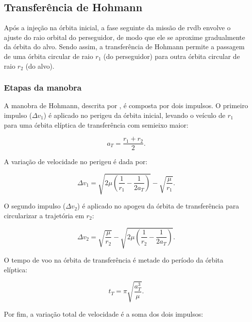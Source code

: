 \subsection{Transferência de Hohmann}
\label{sec:transf_hohmann}

Após a injeção na órbita inicial, a fase seguinte da missão de \gls{rvdb} envolve o ajuste do raio orbital do perseguidor, de modo que ele se aproxime gradualmente da órbita do alvo.
Sendo assim, a transferência de Hohmann permite a passagem de uma órbita circular de raio $r_1$ (do perseguidor) para outra órbita circular de raio $r_2$ (do alvo).

\subsubsection{Etapas da manobra}

A manobra de Hohmann, descrita por \cite{weberHohmann}, é composta por dois impulsos.
O primeiro impulso ($\Delta v_1$) é aplicado no perigeu da órbita inicial, levando o veículo de $r_1$ para uma órbita elíptica de transferência com semieixo maior:

\begin{equation}
a_T = \frac{r_1+r_2}{2}.
\end{equation}

A variação de velocidade no perigeu é dada por:

\begin{equation}
\Delta v_1 = \sqrt{2\mu \left(\frac{1}{r_1} - \frac{1}{2a_T}\right)} - \sqrt{\frac{\mu}{r_1}}.
\end{equation}

O segundo impulso ($\Delta v_2$) é aplicado no apogeu da órbita de transferência para circularizar a trajetória em $r_2$:

\begin{equation}
\Delta v_2 = \sqrt{\frac{\mu}{r_2}} - \sqrt{2\mu \left(\frac{1}{r_2} - \frac{1}{2a_T}\right)}.
\end{equation}

O tempo de voo na órbita de transferência é metade do período da órbita elíptica:

\begin{equation}
t_T = \pi \sqrt{\frac{a_T^3}{\mu}}.
\end{equation}

Por fim, a variação total de velocidade é a soma dos dois impulsos:


